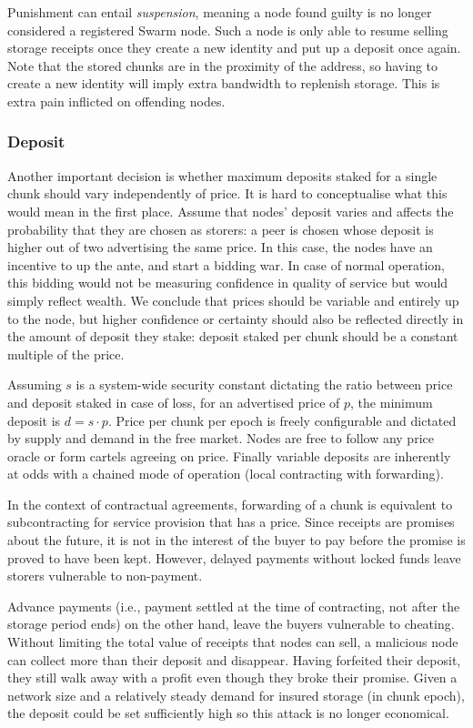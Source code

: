 Punishment can entail \emph{suspension}, meaning a node found guilty is no longer considered a registered Swarm node. Such a node is only able to resume selling storage receipts once they create a new identity and put up a deposit once again. Note that the stored chunks are in the proximity of the address, so having to create a new identity will imply extra bandwidth to replenish storage. This is extra pain inflicted on offending nodes.


\subsubsection{Deposit}

Another important decision is whether maximum deposits staked for a single chunk should vary independently of price. It is hard to conceptualise what this would mean in the first place. Assume that nodes' deposit varies and affects the probability that they are chosen as storers: a peer is chosen whose deposit is higher out of two advertising the same price. In this case, the nodes have an incentive to up the ante, and start a bidding war. In case of normal operation, this bidding would not be measuring confidence in quality of service but would simply reflect wealth.
We conclude that prices should be variable and entirely up to the node, but higher confidence or certainty should also be reflected directly in the amount of deposit they stake: deposit staked per chunk should be a constant multiple of the price.

Assuming $s$ is a system-wide security constant dictating the ratio between price and deposit staked in case of loss, for an advertised price of $p$, the minimum deposit is $d=s\cdot p$. Price per chunk per epoch is freely configurable and dictated by supply and demand in the free market. Nodes are free to follow any price oracle or form cartels agreeing on price. Finally variable deposits are inherently at odds with a chained mode of operation (local contracting with forwarding).

In the context of contractual agreements, forwarding of a chunk is equivalent to subcontracting for service provision that has a price. Since receipts are promises about the future, it is not in the interest of the buyer to pay before the promise is proved to have been kept. However, delayed payments without locked funds leave storers vulnerable to non-payment.

Advance payments (i.e., payment settled at the time of contracting, not after the storage period ends) on the other hand, leave the buyers vulnerable to cheating.
Without limiting the total value of receipts that nodes can sell, a malicious node can collect more than their deposit and disappear. Having forfeited their deposit, they still walk away with a profit even though they broke their promise. Given a network size and a relatively steady demand for insured storage (in chunk epoch), the deposit could be set sufficiently high so this attack is no longer economical.

